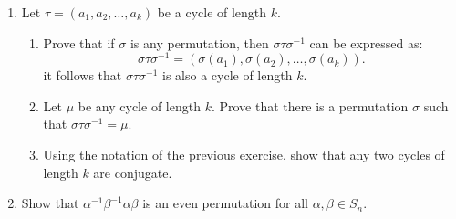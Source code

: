 \begin{enumerate}
 
 \item
Let $\tau = (a_1, a_2, \ldots, a_k)$ be a cycle of length $k$.
	\begin{enumerate}
	 \item
	Prove that if $\sigma$ is any permutation, then $\sigma \tau \sigma^{-1 }$ can be expressed as:
	\[
	\sigma \tau \sigma^{-1 } = ( \sigma(a_1), \sigma(a_2), \ldots,
	\sigma(a_k)).
	\]
	it follows that  $\sigma \tau \sigma^{-1 }$ is also a cycle of length $k$.
	 
	 \item
	Let $\mu$ be any cycle of length $k$. Prove that there is a permutation
	$\sigma$ such that $\sigma \tau \sigma^{-1 } = \mu$.
	
	\item
	Using the notation of the previous exercise, show that any two cycles of length $k$ are conjugate. 
	\end{enumerate}
	 
 

 
 
% 
% 
% 
 
 
%
% 
 
 
\item
Show that  $\alpha^{-1} \beta^{-1} \alpha \beta$ is an even permutation for all $\alpha,
\beta \in S_n$. 
 
\end{enumerate}

